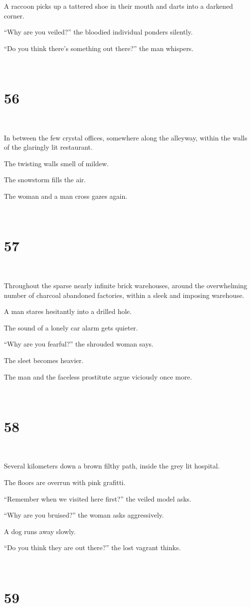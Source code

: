 \documentclass{report}
\begin{document}
A raccoon picks up a tattered shoe in their mouth and darts into a darkened corner.

``Why are you veiled?'' the bloodied individual ponders silently.

``Do you think there's something out there?'' the man whispers.

~
\chapter*{56}
~

In between the few crystal offices, somewhere along the alleyway, within the walls of the glaringly lit restaurant.

The twisting walls smell of mildew.

The snowstorm fills the air.

The woman and a man cross gazes again.

~
\chapter*{57}
~

Throughout the sparse nearly infinite brick warehouses, around the overwhelming number of charcoal abandoned factories, within a sleek and imposing warehouse.

A man stares hesitantly into a drilled hole.

The sound of a lonely car alarm gets quieter.

``Why are you fearful?'' the shrouded woman says.

The sleet becomes heavier.

The man and the faceless prostitute argue viciously once more.

~
\chapter*{58}
~

Several kilometers down a brown filthy path, inside the grey lit hospital.

The floors are overrun with pink grafitti.

``Remember when we visited here first?'' the veiled model asks.

``Why are you bruised?'' the woman asks aggressively.

A dog runs away slowly.

``Do you think they are out there?'' the lost vagrant thinks.

~
\chapter*{59}
~
\end{document}
